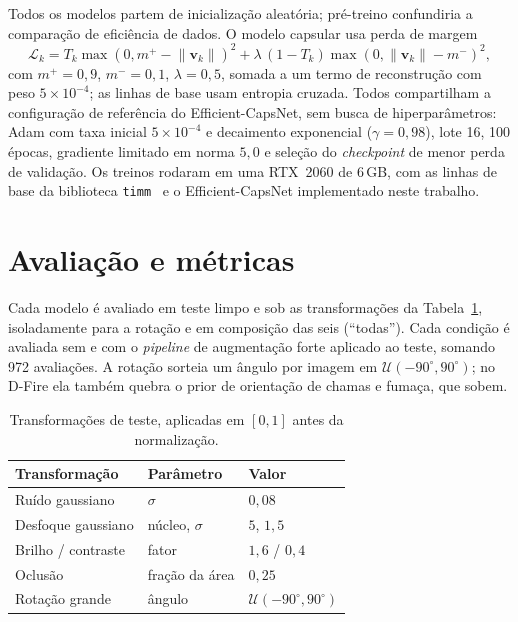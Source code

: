 Todos os modelos partem de inicialização aleatória; pré-treino confundiria a
comparação de eficiência de dados. O modelo capsular usa perda de margem
\begin{equation}
  \mathcal{L}_{k} = T_{k}\max(0, m^{+} - \lVert \mathbf{v}_{k}\rVert)^{2}
  + \lambda\,(1 - T_{k})\max(0, \lVert \mathbf{v}_{k}\rVert - m^{-})^{2},
  \label{eq:margin}
\end{equation}
com $m^{+} = 0{,}9$, $m^{-} = 0{,}1$, $\lambda = 0{,}5$, somada a um termo de
reconstrução com peso $5\times10^{-4}$; as linhas de base usam entropia cruzada.
Todos compartilham a configuração de referência do Efficient-CapsNet, sem busca
de hiperparâmetros: Adam com taxa inicial $5\times10^{-4}$ e decaimento
exponencial ($\gamma = 0{,}98$), lote 16, 100 épocas, gradiente limitado em
norma $5{,}0$ e seleção do \emph{checkpoint} de menor perda de validação. Os
treinos rodaram em uma RTX~2060 de 6\,GB, com as linhas de base da biblioteca
\texttt{timm}~\cite{wightman2019timm} e o Efficient-CapsNet implementado neste
trabalho.

\section{Avaliação e métricas}
\label{sec:protocol:eval}

Cada modelo é avaliado em teste limpo e sob as transformações da
Tabela~\ref{tab:unseen}, isoladamente para a rotação e em composição das seis
(``todas''). Cada condição é avaliada sem e com o \emph{pipeline} de
augmentação forte aplicado ao teste, somando 972 avaliações. A rotação sorteia
um ângulo por imagem em $\mathcal{U}(-90^{\circ}, 90^{\circ})$; no D-Fire ela
também quebra o prior de orientação de chamas e fumaça, que sobem.

\begin{table}[htb]
  \centering
  \caption{Transformações de teste, aplicadas em $[0,1]$ antes da normalização.}
  \label{tab:unseen}
  \small
  \begin{tabular}{lll}
    \toprule
    Transformação & Parâmetro & Valor \\
    \midrule
    Ruído gaussiano    & $\sigma$         & $0{,}08$ \\
    Desfoque gaussiano & núcleo, $\sigma$ & $5$, $1{,}5$ \\
    Brilho / contraste & fator            & $1{,}6$ / $0{,}4$ \\
    Oclusão            & fração da área   & $0{,}25$ \\
    Rotação grande     & ângulo           & $\mathcal{U}(-90^{\circ}, 90^{\circ})$ \\
    \bottomrule
  \end{tabular}
\end{table}

